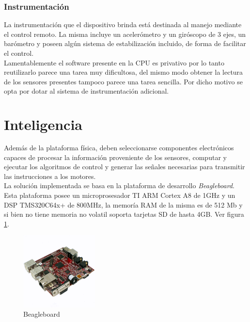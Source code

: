 \documentclass[main]{subfiles}
\begin{document}
\subsubsection*{Instrumentaci\'on}

	La instrumentaci\'on que el dispositivo brinda est\'a destinada al manejo mediante el control remoto. La misma incluye un aceler\'ometro y un gir\'oscopo de 3 ejes, un bar\'ometro y poseen alg\'un sistema de estabilizaci\'on incluido, de forma de facilitar el control. \\

Lamentablemente el software presente en la CPU es privativo por lo tanto reutilizarlo parece una tarea muy dificultosa, del mismo modo obtener la lectura de los sensores presentes tampoco parece una tarea sencilla. Por dicho motivo se opta por dotar al sistema de instrumentaci\'on adicional. 



\section{Inteligencia}

Adem\'as de la plataforma f\'isica, deben seleccionarse componentes electr\'onicos capaces de procesar la informaci\'on proveniente de los sensores, computar y ejecutar los algoritmos de control y generar las se\~nales necesarias para transmitir las instrucciones a los motores.\\

La soluci\'on implementada se basa en la plataforma de desarrollo \emph{Beagleboard}. Esta plataforma posee un microprosesador TI ARM Cortex A8 de 1GHz y un DSP TMS320C64x+ de 800MHz, la memor\'ia RAM de la misma es de 512 Mb y si bien no tiene memoria no volatil soporta tarjetas SD de hasta 4GB. Ver figura \ref{fig:beagle}.

\begin{figure}[!h]
	\centering
	\includegraphics[width=0.35\textwidth]{./pics_eleccion_hardware/beagle.pdf}
	\caption{Beagleboard}
	\label{fig:beagle}
\end{figure}
\end{document}
